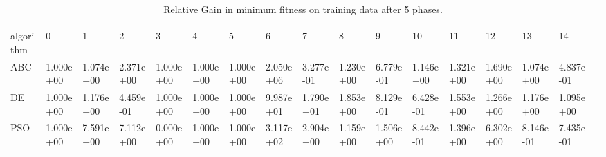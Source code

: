 \begin{landscape}
\begin{table}[]
\centering
\caption{Relative Gain in minimum fitness on training data after 5 phases.}
\label{table:5phasemintrain}
\begin{adjustbox}{width=1.7\textwidth}
\begin{tabular}{lllllllllllllllll}
     &           &           &           &           &           &           &           &           &           &           &           &           &           &           &           &  \\
algorithm           & 0         & 1         & 2         & 3         & 4         & 5         & 6         & 7         & 8         & 9         & 10        & 11        & 12        & 13        & 14        &  \\
ABC                 & 1.000e+00 & 1.074e+00 & 2.371e+00 & 1.000e+00 & 1.000e+00 & 1.000e+00 & 2.050e+06 & 3.277e-01 & 1.230e+00 & 6.779e-01 & 1.146e+00 & 1.321e+00 & 1.690e+00 & 1.074e+00 & 4.837e-01 &  \\
DE                  & 1.000e+00 & 1.176e+00 & 4.459e-01 & 1.000e+00 & 1.000e+00 & 1.000e+00 & 9.987e+01 & 1.790e+01 & 1.853e+00 & 8.129e-01 & 6.428e-01 & 1.553e+00 & 1.266e+00 & 1.176e+00 & 1.095e+00 &  \\
PSO                 & 1.000e+00 & 7.591e+00 & 7.112e+00 & 0.000e+00 & 1.000e+00 & 1.000e+00 & 3.117e+02 & 2.904e+00 & 1.159e+00 & 1.506e+00 & 8.442e-01 & 1.396e+00 & 6.302e+00 & 8.146e-01 & 7.435e-01 &  \\

\end{tabular}
\end{adjustbox}
\end{table}


\end{landscape}
